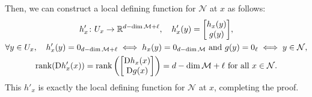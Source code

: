 \documentclass[12pt,dvipdfmx]{article}
\theoremstyle{plain}
\begin{document}
{    Then, we can construct a local defining function for $\mathcal{N}$ at $x$ as follows:
    \begin{gather*}
        h'_x\colon U_x \to \mathbb{R}^{d - \dim \mathcal{M} + \ell}, \quad h'_x(y) = \mqty[h_x(y) \\ g(y)],\\
        \forall y \in U_x, \quad h'_x(y) = 0_{d - \dim \mathcal{M} + \ell} \iff h_x(y) = 0_{d - \dim \mathcal{M}} \text{ and } g(y) = 0_\ell \iff y \in \mathcal{N},\\
        \mathrm{rank}(\mathrm{D} h'_x(x)) = \mathrm{rank}\left(\mqty[\mathrm{D} h_x(x) \\ \mathrm{D} g(x)]\right) = d - \dim \mathcal{M} + \ell \text{ for all } x \in \mathcal{N}.
    \end{gather*}
    This $h'_x$ is exactly the local defining function for $\mathcal{N}$ at $x$, completing the proof.
}
\end{document}
